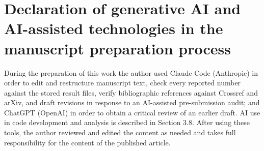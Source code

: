 \documentclass[preprint,12pt,nopreprintline]{elsarticle}
\begin{document}
\section*{Declaration of generative AI and AI-assisted technologies in the manuscript preparation process}
During the preparation of this work the author used Claude Code (Anthropic) in order to edit
and restructure manuscript text, check every reported number against the stored result files,
verify bibliographic references against Crossref and arXiv, and draft revisions in response to
an AI-assisted pre-submission audit; and ChatGPT (OpenAI) in order to obtain a critical review
of an earlier draft. AI use in code development and analysis is described in Section 3.8. After using these tools, the
author reviewed and edited the content as needed and takes full responsibility for the content
of the published article.
\end{document}
